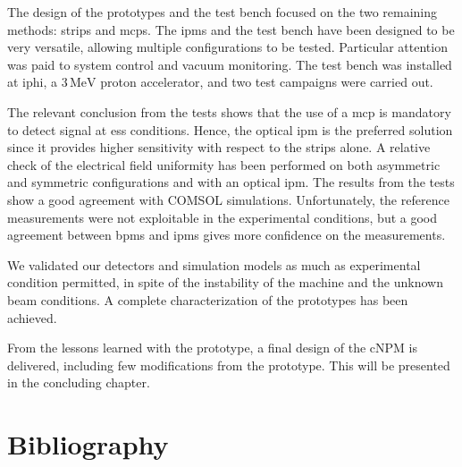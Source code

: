 \begin{refsection}
  The design of the prototypes and the test bench focused on the two remaining methods: strips and \acrshort{mcp}s. The \acrshort{ipm}s and the test bench have been designed to be very versatile, allowing multiple configurations to be tested. Particular attention was paid to system control and vacuum monitoring. The test bench was installed at \acrshort{iphi}, a $3\,\mathrm{MeV}$ proton accelerator, and two test campaigns were carried out.

  The relevant conclusion from the tests shows that the use of a \acrshort{mcp} is mandatory to detect signal at \acrshort{ess} conditions. Hence, the optical \acrshort{ipm} is the preferred solution since it provides higher sensitivity with respect to the strips alone. A relative check of the electrical field uniformity has been performed on both asymmetric and symmetric configurations and with an optical \acrshort{ipm}. The results from the tests show a good agreement with COMSOL simulations.
  Unfortunately, the reference measurements were not exploitable in the experimental conditions, but a good agreement between \acrshort{bpm}s and \acrshort{ipm}s gives more confidence on the measurements.

  We validated our detectors and simulation models as much as experimental condition permitted, in spite of the instability of the machine and the unknown beam conditions. A complete characterization of the prototypes has been achieved.

  From the lessons learned with the prototype, a final design of the cNPM is delivered, including few modifications from the prototype. This will be presented in the concluding chapter.

  \cleardoublepage
  \section{Bibliography}
  \label{ch4:bib}
  \printbibliography[heading=subbibliography]

\end{refsection}

